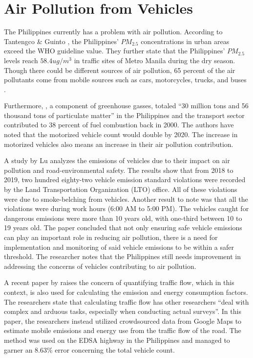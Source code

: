 \section{Air Pollution from Vehicles}
The Philippines currently has a problem with air pollution. According to Tantengco \& Guinto \citeyear{TANTENGCO2022}, the Philippines’ $PM_{2.5}$ concentrations in urban areas exceed the WHO guideline value. They further state that the Philippines’ $PM_{2.5}$ levels reach $58.4 ug/m^{3}$ in traffic sites of Metro Manila during the dry season. Though there could be different sources of air pollution, 65 percent of the air pollutants come from mobile sources such as cars, motorcycles, trucks, and buses \cite{EMB_2015}.

	Furthermore, , a component of greenhouse gasses, totaled “30 million tons and 56 thousand tons of particulate matter” \cite{FabianGota2009} in the Philippines and the transport sector contributed to 38 percent of fuel combustion back in 2000. The authors have noted that the motorized vehicle count would double by 2020. The increase in motorized vehicles also means an increase in their air pollution contribution. 

A study by Lu \citeyear{lu_2022} analyzes the emissions of vehicles due to their impact on air pollution and road-environmental safety. The results show that from 2018 to 2019, two hundred eighty-two vehicle emission standard violations were recorded by the Land Transportation Organization (LTO) office. All of these violations were due to smoke-belching from vehicles. Another result to note was that all the violations were during work hours (6:00 AM to 5:00 PM). The vehicles caught for dangerous emissions were more than 10 years old, with one-third between 10 to 19 years old. The paper concluded that not only ensuring safe vehicle emissions can play an important role in reducing air pollution, there is a need for implementation and monitoring of said vehicle emissions to be within a safer threshold. The researcher notes that the Philippines still needs improvement in addressing the concerns of vehicles contributing to air pollution.

A recent paper by  raises the concern of quantifying traffic flow, which in this context, is also used for calculating the emission and energy consumption factors. The researchers state that calculating traffic flow has other researchers “deal with complex and arduous tasks, especially when conducting actual surveys”. In this paper, the researchers instead utilized crowdsourced data from Google Maps to estimate mobile emissions and energy use from the traffic flow of the road. The method was used on the EDSA highway in the Philippines and managed to garner an 8.63\% error concerning the total vehicle count.

